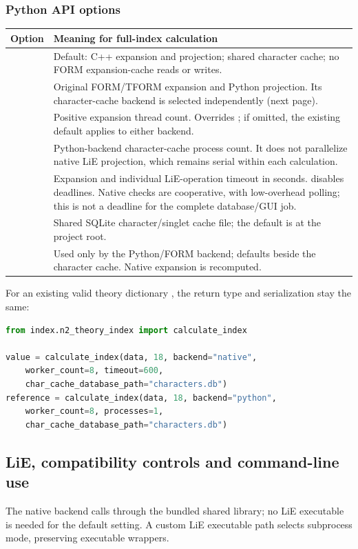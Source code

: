 \subsubsection{Python API options}
\begin{tabularx}{\textwidth}{@{}p{49mm}Y@{}}
\toprule Option & Meaning for full-index calculation\\\midrule
{} & Default: C++ expansion and projection; shared
character cache; no FORM expansion-cache reads or writes.\\
 & Original FORM/TFORM expansion and Python projection.
Its character-cache backend is selected independently (next page).\\
 & Positive expansion thread count. Overrides
; if omitted, the existing  default
applies to either backend.\\
 & Python-backend character-cache process count. It does not
parallelize native LiE projection, which remains serial within each calculation.\\
 & Expansion and individual LiE-operation timeout in seconds.
 disables deadlines. Native checks are cooperative, with low-overhead
polling; this is not a deadline for the complete database/GUI job.\\
 & Shared SQLite character/singlet cache file;
the default is  at the project root.\\
 & Used only by the Python/FORM backend; defaults
beside the character cache. Native expansion is recomputed.\\\bottomrule
\end{tabularx}

For an existing valid theory dictionary , the return type and
serialization stay the same:
\begin{lstlisting}[language=Python]
from index.n2_theory_index import calculate_index

value = calculate_index(data, 18, backend="native",
    worker_count=8, timeout=600,
    char_cache_database_path="characters.db")
reference = calculate_index(data, 18, backend="python",
    worker_count=8, processes=1,
    char_cache_database_path="characters.db")
\end{lstlisting}

\clearpage
\subsection{LiE, compatibility controls and command-line use}
The native backend calls  through the bundled shared
library; no LiE executable is needed for the default
 setting. A custom LiE executable path selects
subprocess mode, preserving executable wrappers.

